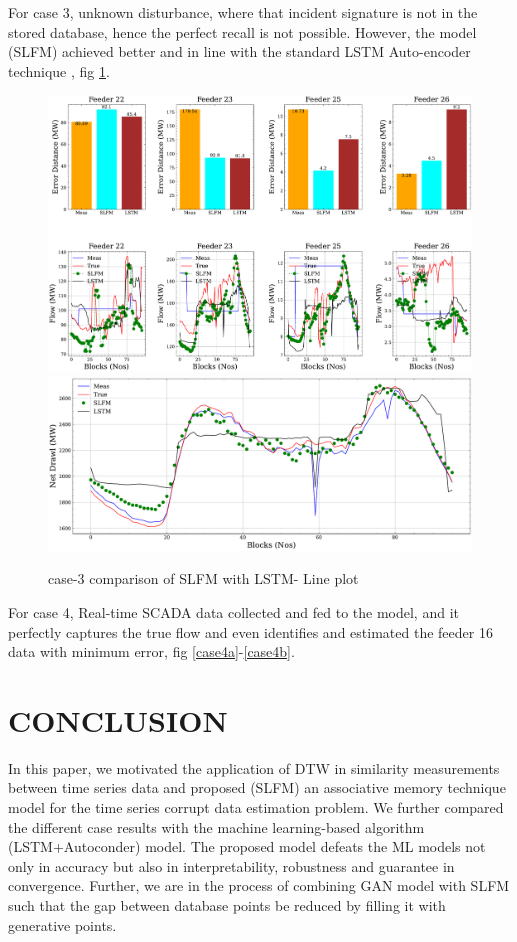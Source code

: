 \documentclass[conference]{IEEEtran}
\begin{document}
For case 3, unknown disturbance, where that incident signature is not in the stored database, hence the perfect recall is not possible. However, the model (SLFM) achieved better and in line with the standard LSTM Auto-encoder technique , fig \ref{case3}.\\
\begin{figure}[!ht]
\includegraphics[width=1\linewidth]{Test_results13.pdf}
\includegraphics[width=1\linewidth]{Test_results_full3.pdf}
\caption{case-3 comparison of SLFM with LSTM- Line plot}
\label{case3}
\end{figure}

For case 4, Real-time SCADA data collected and fed to the model, and it perfectly captures the true flow and even identifies and estimated the feeder 16 data with minimum error, fig \ref{case4a}-\ref{case4b}.\\

\section{CONCLUSION}
In this paper, we motivated the application of DTW in similarity measurements between time series data and proposed (SLFM) an associative memory technique model for the time series corrupt data estimation problem. We further compared the different case results with the machine learning-based algorithm (LSTM+Autoconder) model. The proposed model defeats the ML models not only in accuracy but also in interpretability, robustness and guarantee in convergence. Further, we are in the process of combining GAN model with SLFM such that the gap between database points be reduced by filling it with generative points.
\end{document}
